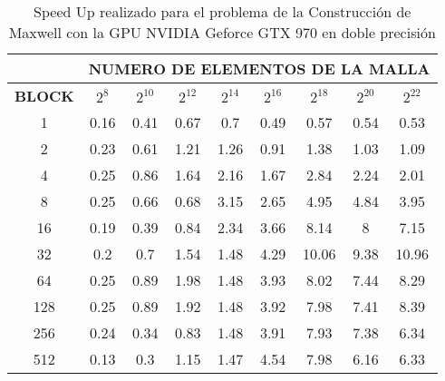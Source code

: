 \begin{table}[h!]
\centering
    \begin{tabular}{|c|c|c|c|c|c|c|c|c|}
    \hline
                   & \multicolumn{8}{c|}{\textbf{NUMERO DE ELEMENTOS DE LA MALLA}} \\ \hline
    \textbf{BLOCK} & $2^{8}$ & $2^{10}$& $2^{12}$& $2^{14}$& $2^{16}$& $2^{18}$& $2^{20}$& $2^{22}$\\ \hline
    1              & 0.16  & 0.41  & 0.67  & 0.7   & 0.49  & 0.57  & 0.54  & 0.53  \\ \hline
    2              & 0.23  & 0.61  & 1.21  & 1.26  & 0.91  & 1.38  & 1.03  & 1.09  \\ \hline
    4              & 0.25  & 0.86  & 1.64  & 2.16  & 1.67  & 2.84  & 2.24  & 2.01  \\ \hline
    8              & 0.25  & 0.66  & 0.68  & 3.15  & 2.65  & 4.95  & 4.84  & 3.95  \\ \hline
    16             & 0.19  & 0.39  & 0.84  & 2.34  & 3.66  & 8.14  & 8     & 7.15  \\ \hline
    32             & 0.2   & 0.7   & 1.54  & 1.48  & 4.29  & 10.06 & 9.38  & 10.96 \\ \hline
    64             & 0.25  & 0.89  & 1.98  & 1.48  & 3.93  & 8.02  & 7.44  & 8.29  \\ \hline
    128            & 0.25  & 0.89  & 1.92  & 1.48  & 3.92  & 7.98  & 7.41  & 8.39  \\ \hline
    256            & 0.24  & 0.34  & 0.83  & 1.48  & 3.91  & 7.93  & 7.38  & 6.34  \\ \hline
    512            & 0.13  & 0.3   & 1.15  & 1.47  & 4.54  & 7.98  & 6.16  & 6.33  \\ \hline
    \end{tabular}
    \caption{Speed Up realizado para el problema de la Construcción de Maxwell con la GPU NVIDIA Geforce GTX 970 en doble precisión}
    \label{tab:s_970_MxC_double_10}
    \end{table}